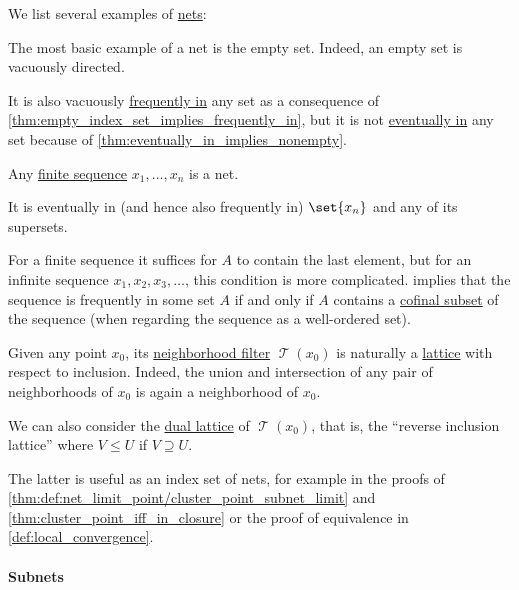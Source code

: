 \begin{example}\label{ex:def:topological_net}
  We list several examples of \hyperref[def:topological_net]{nets}:
  \begin{thmenum}
     The most basic example of a net is the empty set. Indeed, an empty set is vacuously directed.

    It is also vacuously \hyperref[def:net_frequently_in]{frequently in} any set as a consequence of \cref{thm:empty_index_set_implies_frequently_in}, but it is not \hyperref[def:net_eventually_in]{eventually in} any set because of \cref{thm:eventually_in_implies_nonempty}.

     Any \hyperref[def:sequence]{finite sequence} \( x_1, \ldots, x_n \) is a net.

    It is eventually in (and hence also frequently in) \( \set{ x_n } \) and any of its supersets.

     For a finite sequence it suffices for \( A \) to contain the last element, but for an infinite sequence \( x_1, x_2, x_3, \ldots \), this condition is more complicated.  implies that the sequence is frequently in some set \( A \) if and only if \( A \) contains a \hyperref[def:cofinal_set]{cofinal subset} of the sequence (when regarding the sequence as a well-ordered set).

     Given any point \( x_0 \), its \hyperref[def:neighborhood_filter]{neighborhood filter} \( \mscrT(x_0) \) is naturally a \hyperref[def:lattice]{lattice} with respect to inclusion. Indeed, the union and intersection of any pair of neighborhoods of \( x_0 \) is again a neighborhood of \( x_0 \).

    We can also consider the \hyperref[thm:lattice_duality]{dual lattice} of \( \mscrT(x_0) \), that is, the \enquote{reverse inclusion lattice} where \( V \leq U \) if \( V \supseteq U \).

    The latter is useful as an index set of nets, for example in the proofs of \cref{thm:def:net_limit_point/cluster_point_subnet_limit} and \cref{thm:cluster_point_iff_in_closure} or the proof of equivalence in \cref{def:local_convergence}.
  \end{thmenum}
\end{example}

\paragraph{Subnets}

